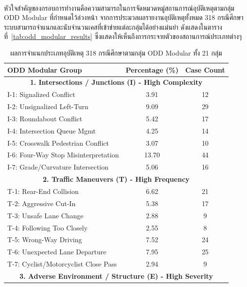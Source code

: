 \paragraph{}
หัวใจสำคัญของกรอบการทำงานคือความสามารถในการจัดหมวดหมู่สถานการณ์อุบัติเหตุตามกลุ่ม ODD Modular ที่กำหนดไว้ล่วงหน้า จากการประมวลผลรายงานอุบัติเหตุทั้งหมด 318 กรณีศึกษา ระบบสามารถจำแนกและนับจำนวนเคสที่เข้าข่ายแต่ละกลุ่มได้อย่างแม่นยำ ดังแสดงในตารางที่~\ref{tab:odd_modular_results} ซึ่งแสดงให้เห็นถึงการกระจายตัวของสถานการณ์ประเภทต่างๆ

\begin{table}[htbp]
    \centering
    \caption{ผลการจำแนกประเภทอุบัติเหตุ 318 กรณีศึกษาตามกลุ่ม ODD Modular ทั้ง 21 กลุ่ม}
    \label{tab:odd_modular_distribution}
    \begin{tabular}{|l|c|c|}
        \hline
        \rowcolor{gray!20} \textbf{ODD Modular Group} & \textbf{Percentage (\%)} & \textbf{Case Count} \\
        \hline
        \multicolumn{3}{|c|}{\textbf{1. Intersections / Junctions (I) - High Complexity}} \\
        \hline
        I-1: Signalized Conflict & 3.91 & 12 \\
        I-2: Unsignalized Left-Turn & 9.09 & 29 \\
        I-3: Roundabout Conflict & 5.42 & 17 \\
        I-4: Intersection Queue Mgmt & 4.25 & 14 \\
        I-5: Crosswalk Pedestrian Conflict & 3.07 & 10 \\
        I-6: Four-Way Stop Misinterpretation & 13.70 & 44 \\
        I-7: Grade/Curvature Intersection & 5.06 & 16 \\
        \hline
        \multicolumn{3}{|c|}{\textbf{2. Traffic Maneuvers (T) - High Frequency}} \\
        \hline
        T-1: Rear-End Collision & 6.62 & 21 \\
        T-2: Aggressive Cut-In & 5.38 & 17 \\
        T-3: Unsafe Lane Change & 2.88 & 9 \\
        T-4: Following Too Closely & 2.55 & 8 \\
        T-5: Wrong-Way Driving & 7.52 & 24 \\
        T-6: Unexpected Lane Departure & 7.95 & 25 \\
        T-7: Cyclist/Motorcyclist Close Pass & 2.94 & 9 \\
        \hline
        \multicolumn{3}{|c|}{\textbf{3. Adverse Environment / Structure (E) - High Severity}} \\

\end{tabular}
\end{table}
